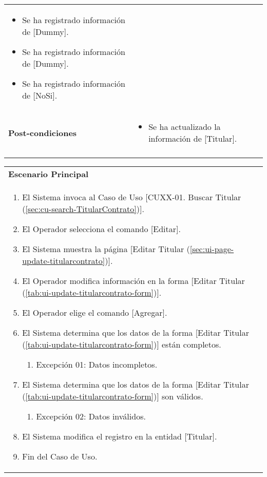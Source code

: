 \begin{tabular}{ p{3.5cm} p{11.5cm} }
\begin{minipage}[t]{0.6\textwidth}
\begin{itemize}[noitemsep,nolistsep]
				\item Se ha registrado informaci\'on de [Dummy].
				\item Se ha registrado informaci\'on de [Dummy].
				\item Se ha registrado informaci\'on de [NoSi].
			\end{itemize}
			\end{minipage} \\
		\textbf{Post-condiciones} &
			\begin{minipage}[t]{0.6\textwidth}
			\begin{itemize}[noitemsep,nolistsep]
			\setlength{\itemindent}{-.5cm}
				\item Se ha actualizado la informaci\'on de [Titular].
			\end{itemize}
			\end{minipage} \\
		\\
	\end{tabular}
	
	\begin{tabular}{ p{15.5cm} }
		\textbf{Escenario Principal} \\
		\begin{enumerate}
			\item El Sistema invoca al Caso de Uso [CUXX-01. Buscar Titular (\ref{sec:cu-search-TitularContrato})].
			\item El Operador selecciona el comando [Editar].
			\item El Sistema muestra la p\'agina [Editar Titular (\ref{sec:ui-page-update-titularcontrato})].
			\item El Operador modifica informaci\'on en la forma [Editar Titular (\ref{tab:ui-update-titularcontrato-form})].
			\item El Operador elige el comando [Agregar].
			\item El Sistema determina que los datos de la forma [Editar Titular (\ref{tab:ui-update-titularcontrato-form})] est\'an completos.
				\begin{enumerate}
					\item Excepci\'on 01: Datos incompletos.
				\end{enumerate}
			\item El Sistema determina que los datos de la forma [Editar Titular (\ref{tab:ui-update-titularcontrato-form})] son v\'alidos.
				\begin{enumerate}
					\item Excepci\'on 02: Datos inv\'alidos.
				\end{enumerate}
			\item El Sistema modifica el registro en la entidad [Titular].
			\item Fin del Caso de Uso.
		\end{enumerate}
	\end{tabular}
	

